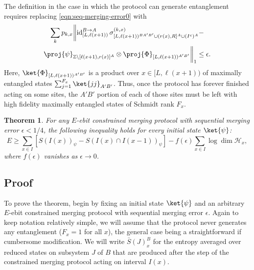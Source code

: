 \documentclass[12pt]{article}
\newtheorem{theorem}{Theorem}[section]
\begin{document}
The definition in the case in which the protocol can generate entanglement requires replacing \eqref{eqn:seq-merging-error0} with
\begin{multline} \label{eqn:seq-merging-error}
\sum_k p_{k,x} \biggl\|
 \operatorname{id}_{[L,\ell(x+1))}^{B \rightarrow A} \sigma^{(k,x)}_{[L,\ell(x+1))^{BA'B'} \cup (r(x),R]^A \cup (I^c)^A } -  \\
 \proj{\psi}_{\mathbb{Z} \setminus [\ell(x+1),r(x)]^A}
 					\otimes \proj{\Phi}_{[L,\ell(x+1))^{A'B'}}
\biggr\|_1 \leq \epsilon.
\end{multline}
Here, $\ket{\Phi}_{[L,\ell(x+1))^{A'B'}}$ is a product over $x \in [L,\ell(x+1))$ of maximally entangled states $\sum_{j=1}^{F_x} \ket{jj}_{A'B'}$. Thus, once the protocol has forever finished acting on some sites, the $A'B'$ portion of each of those sites must be left with high fidelity maximally entangled states of Schmidt rank $F_x$.
\begin{theorem}
For any $E$-ebit constrained merging protocol with sequential merging error $\epsilon < 1/4$, the following inequality holds for every initial state $\ket{\psi}$:
\begin{equation}
E \geq \sum_{x \in I} \left[ S\left( I(x) \right)_\psi - S\left( I(x) \cap I(x-1) \right)_\psi \right] - f( \epsilon ) \sum_{x \in I} \log \dim \mathcal{H}_x,
\end{equation}
where $f(\epsilon)$ vanishes as $\epsilon \rightarrow 0$.
\end{theorem}

\subsection{Proof}

To prove the theorem, begin by fixing an initial state $\ket{\psi}$ and an arbitrary $E$-ebit constrained merging protocol with sequential merging error $\epsilon$.  Again to keep notation relatively simple, we will assume that the protocol never generates any entanglement ($F_x=1$ for all $x$), the general case being a straightforward if cumbersome modification. We will write $\bar{S}(J)^B_x$ for the entropy averaged over reduced states on subsystem $J$ of $B$ that are produced after the step of the constrained merging protocol acting on interval $I(x)$.
\end{document}
